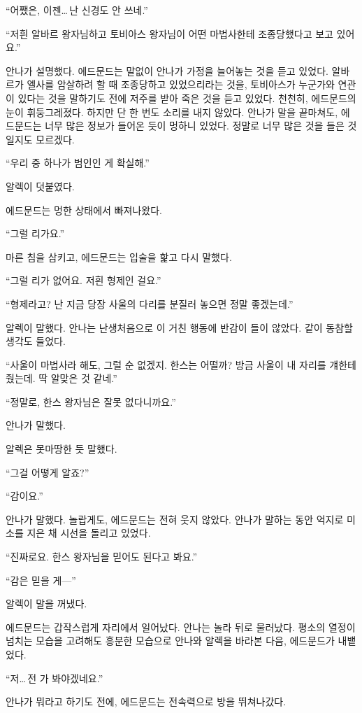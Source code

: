 ``어쨌은, 이젠\ldots\,난 신경도 안 쓰네.''

``저흰 알바르 왕자님하고 토비아스 왕자님이 어떤 마법사한테 조종당했다고 보고 있어요.''

안나가 설명했다. 에드문드는 말없이 안나가 가정을 늘어놓는 것을 듣고 있었다. 알바르가 엘사를 암살하려 할 때 조종당하고 있었으리라는 것을, 토비아스가 누군가와 연관이 있다는 것을 말하기도 전에 저주를 받아 죽은 것을 듣고 있었다. 천천히, 에드문드의 눈이 휘둥그레졌다. 하지만 단 한 번도 소리를 내지 않았다. 안나가 말을 끝마쳐도, 에드문드는 너무 많은 정보가 들어온 듯이 멍하니 있었다. 정말로 너무 많은 것을 들은 것일지도 모르겠다.

``우리 중 하나가 범인인 게 확실해.''

알렉이 덧붙였다.

에드문드는 멍한 상태에서 빠져나왔다.

``그럴 리가요.''

마른 침을 삼키고, 에드문드는 입술을 핥고 다시 말했다.

``그럴 리가 없어요. 저흰 형제인 걸요.''

``형제라고? 난 지금 당장 사울의 다리를 분질러 놓으면 정말 좋겠는데.''

알렉이 말했다. 안나는 난생처음으로 이 거친 행동에 반감이 들이 않았다. 같이 동참할 생각도 들었다.

``사울이 마법사라 해도, 그럴 순 없겠지. 한스는 어떨까? 방금 사울이 내 자리를 걔한테 줬는데. 딱 알맞은 것 같네.''

``정말로, 한스 왕자님은 잘못 없다니까요.''

안나가 말했다.

알렉은 못마땅한 듯 말했다.

``그걸 어떻게 알죠?''

``감이요.''

안나가 말했다. 놀랍게도, 에드문드는 전혀 웃지 않았다. 안나가 말하는 동안 억지로 미소를 지은 채 시선을 돌리고 있었다.

``진짜로요. 한스 왕자님을 믿어도 된다고 봐요.''

``감은 믿을 게—''

알렉이 말을 꺼냈다.

에드문드는 갑작스럽게 자리에서 일어났다. 안나는 놀라 뒤로 물러났다. 평소의 열정이 넘치는 모습을 고려해도 흥분한 모습으로 안나와 알렉을 바라본 다음, 에드문드가 내뱉었다.

``저\ldots\,전 가 봐야겠네요.''

안나가 뭐라고 하기도 전에, 에드문드는 전속력으로 방을 뛰쳐나갔다.

